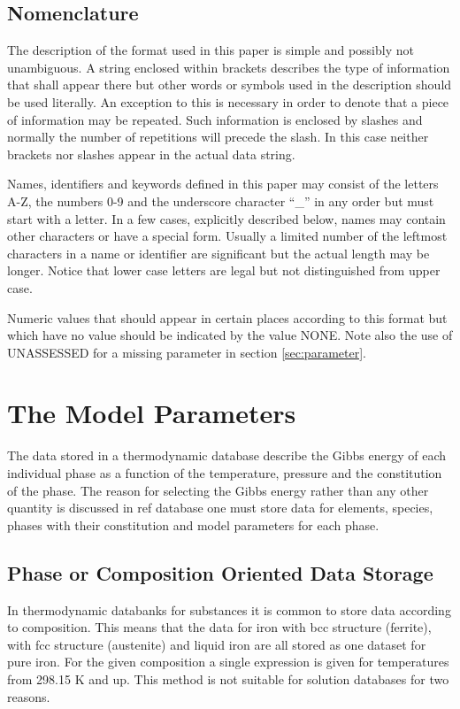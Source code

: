 \documentclass[12pt]{article}
\begin{document}
\subsection{Nomenclature}

The description of the format used in this paper is simple and
possibly not unambiguous. A string enclosed within brackets describes
the type of information that shall appear there but other words or
symbols used in the description should be used literally. An
exception to this is necessary in order to denote that a piece of
information may be repeated. Such information is enclosed by slashes
and normally the number of repetitions will precede the slash. In this
case neither brackets nor slashes appear in the actual data string.

Names, identifiers and keywords defined in this paper may consist of
the letters A-Z, the numbers 0-9 and the underscore character ``\_'' in
any order but must start with a letter. In a few cases, explicitly
described below, names may contain other characters or have a special
form. Usually a limited number of the leftmost characters in a name
or identifier are significant but the actual length may be longer.
Notice that lower case letters are legal but not distinguished from
upper case.

Numeric values that should appear in certain places according to this
format but which have no value should be indicated by the value NONE.
Note also the use of UNASSESSED for a missing parameter in section 
\ref{sec:parameter}.

\section{The Model Parameters}

The data stored in a thermodynamic database describe the Gibbs energy
of each individual phase as a function of the temperature, pressure
and the constitution of the phase. The reason for selecting the Gibbs
energy rather than any other quantity is discussed in ref %
database one must store data for elements, species, phases with their
constitution and model parameters for each phase.

\subsection{Phase or Composition Oriented Data Storage}

In thermodynamic databanks for substances it is common to store data
according to composition. This means that the data for iron with bcc
structure (ferrite), with fcc structure (austenite) and liquid iron
are all stored as one dataset for pure iron. For the given composition
a single expression is given for temperatures from 298.15 K and up.
This method is not suitable for solution databases for two reasons.
\end{document}
